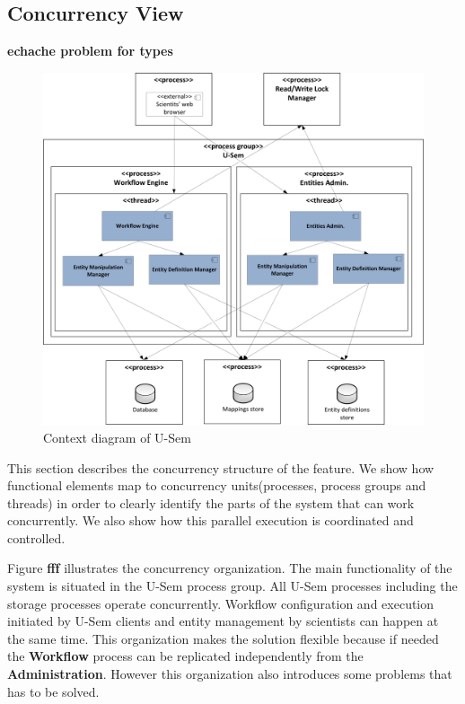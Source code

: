 \documentclass[a4paper, notitlepage]{article}
\begin{document}
\subsection{Concurrency View}
\textbf{echache problem for types}

\begin{figure}[h!]
  \centering
  	\includegraphics[scale=0.5]{functional/concur.png}
  \caption{Context diagram of U-Sem }
  \label{fig_context}
\end{figure}

This section describes the concurrency structure of the feature. We show how functional elements map to concurrency units(processes, process groups and threads) in order to clearly identify the parts of the system that can work concurrently. We also show how this parallel execution is coordinated and controlled.

Figure \textbf{fff} illustrates the concurrency organization. The main functionality of the system is situated in the U-Sem process group. All U-Sem processes including the storage processes operate concurrently. Workflow configuration and execution initiated by U-Sem clients and entity management by scientists can happen at the same time. This organization makes the solution flexible because if needed the \textbf{Workflow} process can be replicated independently from the \textbf{Administration}. However this organization also introduces some problems that has to be solved.
\end{document}
